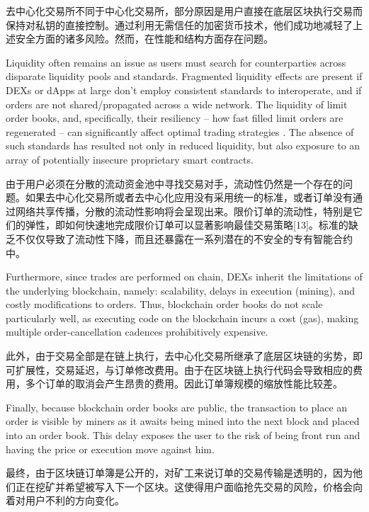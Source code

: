 \documentclass[UTF8,nofonts]{ctexart}
\begin{document}
\begin{multicols}{2}
去中心化交易所不同于中心化交易所，部分原因是用户直接在底层区块执行交易而保持对私钥的直接控制。通过利用无需信任的加密货币技术，他们成功地减轻了上述安全方面的诸多风险。然而，在性能和结构方面存在问题。


Liquidity often remains an issue as users must search for counterparties across disparate liquidity pools and standards. Fragmented liquidity effects are present if DEXs or dApps at large don't employ consistent standards to interoperate, and if orders are not shared/propagated across a wide network. The liquidity of limit order books, and, specifically, their resiliency -- how fast filled limit orders are regenerated -- can significantly affect optimal trading strategies \cite{limitorderliquidity}. The absence of such standards has resulted not only in reduced liquidity, but also exposure to an array of potentially insecure proprietary smart contracts.

  由于用户必须在分散的流动资金池中寻找交易对手，流动性仍然是一个存在的问题。如果去中心化交易所或者去中心化应用没有采用统一的标准，或者订单没有通过网络共享传播，分散的流动性影响将会呈现出来。限价订单的流动性，特别是它们的弹性，即如何快速地完成限价订单可以显著影响最佳交易策略[13]。标准的缺乏不仅仅导致了流动性下降，而且还暴露在一系列潜在的不安全的专有智能合约中。


Furthermore, since trades are performed on chain, DEXs inherit the limitations of the underlying blockchain, namely: scalability, delays in execution (mining), and costly modifications to orders. Thus, blockchain order books do not scale particularly well, as executing code on the blockchain incurs a cost (gas), making multiple order-cancellation cadences prohibitively expensive. 

  此外，由于交易全部是在链上执行，去中心化交易所继承了底层区块链的劣势，即可扩展性，交易延迟，与订单修改费用。由于在区块链上执行代码会导致相应的费用，多个订单的取消会产生昂贵的费用。因此订单簿规模的缩放性能比较差。



Finally, because blockchain order books are public, the transaction to place an order is visible by miners as it awaits being mined into the next block and placed into an order book. This delay exposes the user to the risk of being front run and having the price or execution move against him.

最终，由于区块链订单簿是公开的，对矿工来说订单的交易传输是透明的，因为他们正在挖矿并希望被写入下一个区块。这使得用户面临抢先交易的风险，价格会向着对用户不利的方向变化。



\end{multicols}
\end{document}
